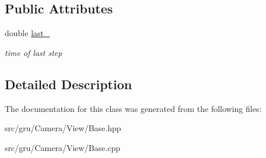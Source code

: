 \subsection*{\-Public \-Attributes}
\begin{DoxyCompactItemize}
\item 
\hypertarget{classglutpp_1_1Camera_1_1View_1_1Base_a2f131c109db4a70bbfdf9fdf38891e52}{double \hyperlink{classglutpp_1_1Camera_1_1View_1_1Base_a2f131c109db4a70bbfdf9fdf38891e52}{last\-\_\-}}\label{classglutpp_1_1Camera_1_1View_1_1Base_a2f131c109db4a70bbfdf9fdf38891e52}

\begin{DoxyCompactList}\small\item\em time of last step \end{DoxyCompactList}\end{DoxyCompactItemize}


\subsection{\-Detailed \-Description}


\-The documentation for this class was generated from the following files\-:\begin{DoxyCompactItemize}
\item 
src/gru/\-Camera/\-View/\-Base.\-hpp\item 
src/gru/\-Camera/\-View/\-Base.\-cpp\end{DoxyCompactItemize}
